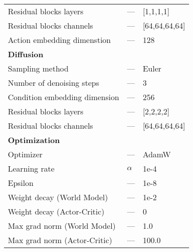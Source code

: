 \begin{table}[h]
\begin{tabular}{lll}
Residual blocks layers & --- & [1,1,1,1] \\
Residual blocks channels & --- & [64,64,64,64] \\
Action embedding dimenstion & --- & 128 \\
\midrule
\multicolumn{3}{l}{\textbf{Diffusion}} \\
Sampling method & --- & Euler \\
Number of denoising steps & --- & 3 \\
Condition embedding dimension & --- & 256 \\
Residual blocks layers & --- & [2,2,2,2] \\
Residual blocks channels & --- & [64,64,64,64] \\
\midrule
\multicolumn{3}{l}{\textbf{Optimization}} \\
Optimizer & --- & AdamW \\
Learning rate & $\alpha$ & 1e-4 \\
Epsilon & --- & 1e-8 \\
Weight decay (World Model) & --- & 1e-2 \\
Weight decay (Actor-Critic) & --- & 0 \\
Max grad norm (World Model) & --- & 1.0 \\
Max grad norm (Actor-Critic) & --- & 100.0 \\
\bottomrule
\end{tabular}
\end{table}